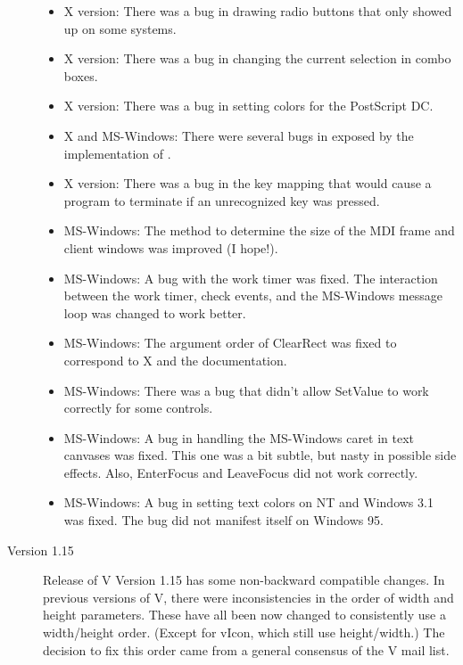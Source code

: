 \begin{description}
\begin{itemize}
\item X version: There was a bug in drawing radio buttons
that only showed up on some systems.

\item X version: There was a bug in changing the current
selection in combo boxes.

\item X version: There was a bug in setting colors for the
PostScript DC.

\item X and MS-Windows: There were several bugs in
 exposed by the implementation
of .

\item X version: There was a bug in the key mapping that would
cause a program to terminate if an unrecognized key was pressed.

\item MS-Windows: The method to determine the size of the MDI
frame and client windows was improved (I hope!).

\item MS-Windows: A bug with the work timer was fixed. The interaction
between the work timer, check events, and the MS-Windows message
loop was changed to work better.

\item MS-Windows: The argument order of ClearRect was fixed to correspond
to X and the documentation.

\item MS-Windows: There was a bug that didn't allow SetValue to work
correctly for some controls.

\item MS-Windows: A bug in handling the MS-Windows caret in text
canvases was fixed. This one was a bit subtle, but nasty in
possible side effects. Also, EnterFocus and LeaveFocus did not work correctly.

\item MS-Windows: A bug in setting text colors on NT and Windows 3.1 was fixed.
The bug did not manifest itself on Windows 95.

\end{itemize}

\item[Version 1.15]

Release of V Version 1.15 has some non-backward compatible
changes. In previous versions of V, there were inconsistencies in
the order of width and height parameters. These have all been now
changed to consistently use a width/height order. (Except for
vIcon, which still use height/width.) The decision to fix this
order came from a general consensus of the V mail list.


\end{description}
